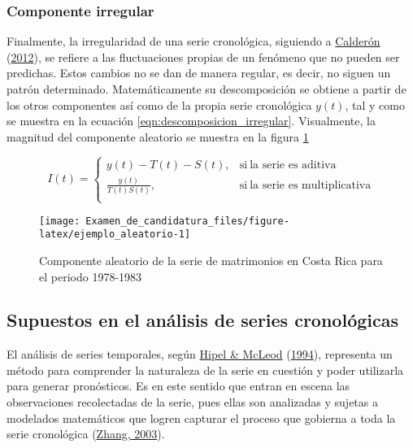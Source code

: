 \documentclass[
]{article}
\begin{document}
\subsubsection{Componente irregular}

Finalmente, la irregularidad de una serie cronológica, siguiendo a
\protect\hyperlink{ref-calderon2012estadistica}{Calderón}
(\protect\hyperlink{ref-calderon2012estadistica}{2012}), se refiere a
las fluctuaciones propias de un fenómeno que no pueden ser predichas.
Estos cambios no se dan de manera regular, es decir, no siguen un patrón
determinado. Matemáticamente su descomposición se obtiene a partir de
los otros componentes así como de la propia serie cronológica \(y(t)\),
tal y como se muestra en la ecuación \ref{eqn:descomposicion_irregular}.
Visualmente, la magnitud del componente aleatorio se muestra en la
figura \ref{fig:ejemplo_aleatorio}

\begin{equation}
\label{eqn:descomposicion_irregular}
I(t)=
\begin{cases}
y(t)-T(t)-S(t), & \text{si}\ \text{la serie es aditiva} \\
\frac{y(t)}{T(t)S(t)} , & \text{si}\ \text{la serie es multiplicativa} \\
\end{cases}
\end{equation}

\begin{figure}[H]
\texttt{[image: Examen\_de\_candidatura\_files/figure-latex/ejemplo\_aleatorio-1]} \caption{Componente aleatorio de la serie de matrimonios en Costa Rica para el periodo 1978-1983}\label{fig:ejemplo_aleatorio}
\end{figure}

\subsection{Supuestos en el análisis de series cronológicas}

El análisis de series temporales, según
\protect\hyperlink{ref-Hipel}{Hipel \& McLeod}
(\protect\hyperlink{ref-Hipel}{1994}), representa un método para
comprender la naturaleza de la serie en cuestión y poder utilizarla para
generar pronósticos. Es en este sentido que entran en escena las
observaciones recolectadas de la serie, pues ellas son analizadas y
sujetas a modelados matemáticos que logren capturar el proceso que
gobierna a toda la serie cronológica
(\protect\hyperlink{ref-Zhang}{Zhang, 2003}).
\end{document}
